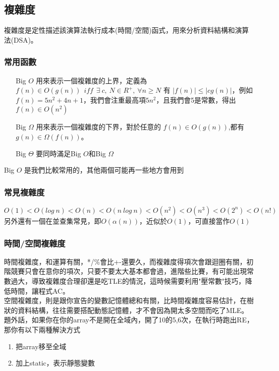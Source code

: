 \subsection{複雜度}
複雜度是定性描述該演算法執行成本(時間/空間)函式，用來分析資料結構和演算法(DSA)。
\subsubsection{常用函數}
\begin{enumerate}
\item [Big $O$]
用來表示一個複雜度的上界，定義為$f(n)\in O(g(n))\ \ iff\ \ \exists\ c,\ N\in R^{+},\ \forall n \geq  N$ 有 $|f(n)| \leq |cg(n)|$，例如$f(n)=5n^2+4n+1$，我們會注重最高項$5n^2$，且我們會5是常數，得出$f(n)\in O(n^2)$
\item [Big $\Omega$]
用來表示一個複雜度的下界，對於任意的 $f(n) \in O(g(n))$,都有 $g(n) \in \Omega (f(n))$。
\item [Big $\Theta$]
要同時滿足Big $O$和Big $\Omega$
\end{enumerate}
Big $O$ 是我們比較常用的，其他兩個可能再一些地方會用到
    
\subsubsection{常見複雜度}
$O(1) < O(log\ n) < O(n) < O(n\ log\ n) < O(n^2) < O(n^3) < O(2^n) < O(n!)$
另外還有一個在並查集常見，即$O(\alpha(n))$，近似於$O(1)$，可直接當作$O(1)$
\subsubsection{時間/空間複雜度}
時間複雜度，和運算有關，*/\%會比+-還要久，而複雜度得項次會跟迴圈有關，初階競賽只會在意你的項次，只要不要太大基本都會過，進階些比賽，有可能出現常數過大，導致複雜度合理卻還是吃TLE的情況，這時候需要利用"壓常數"技巧，降低時間，讓程式AC。 \\  空間複雜度，則是跟你宣告的變數記憶體總和有關，比時間複雜度容易估計，在樹狀的資料結構，往往需要搭配動態記憶體，才不會因為開太多空間而吃了MLE。 \\  題外話，如果你在你的array不是開在全域內，開了10的5,6次，在執行時跑出RE，那你有以下兩種解決方式
\begin{enumerate}
\item 把array移至全域
\item 加上static，表示靜態變數
\end{enumerate}
